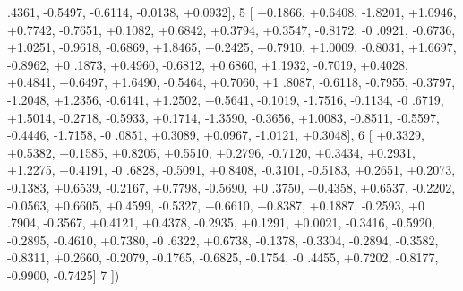 \begin{DoxyCode}
      .4361, -0.5497, -0.6114, -0.0138, +0.0932],
5     [ +0.1866, +0.6408, -1.8201, +1.0946, +0.7742, -0.7651, +0.1082, +0.6842, +0.3794, +0.3547, -0.8172, -0
      .0921, -0.6736, +1.0251, -0.9618, -0.6869, +1.8465, +0.2425, +0.7910, +1.0009, -0.8031, +1.6697, -0.8962, +0
      .1873, +0.4960, -0.6812, +0.6860, +1.1932, -0.7019, +0.4028, +0.4841, +0.6497, +1.6490, -0.5464, +0.7060, +1
      .8087, -0.6118, -0.7955, -0.3797, -1.2048, +1.2356, -0.6141, +1.2502, +0.5641, -0.1019, -1.7516, -0.1134, -0
      .6719, +1.5014, -0.2718, -0.5933, +0.1714, -1.3590, -0.3656, +1.0083, -0.8511, -0.5597, -0.4446, -1.7158, -0
      .0851, +0.3089, +0.0967, -1.0121, +0.3048],
6     [ +0.3329, +0.5382, +0.1585, +0.8205, +0.5510, +0.2796, -0.7120, +0.3434, +0.2931, +1.2275, +0.4191, -0
      .6828, -0.5091, +0.8408, -0.3101, -0.5183, +0.2651, +0.2073, -0.1383, +0.6539, -0.2167, +0.7798, -0.5690, +0
      .3750, +0.4358, +0.6537, -0.2202, -0.0563, +0.6605, +0.4599, -0.5327, +0.6610, +0.8387, +0.1887, -0.2593, +0
      .7904, -0.3567, +0.4121, +0.4378, -0.2935, +0.1291, +0.0021, -0.3416, -0.5920, -0.2895, -0.4610, +0.7380, -0
      .6322, +0.6738, -0.1378, -0.3304, -0.2894, -0.3582, -0.8311, +0.2660, -0.2079, -0.1765, -0.6825, -0.1754, -0
      .4455, +0.7202, -0.8177, -0.9900, -0.7425]
7 ])
\end{DoxyCode}
